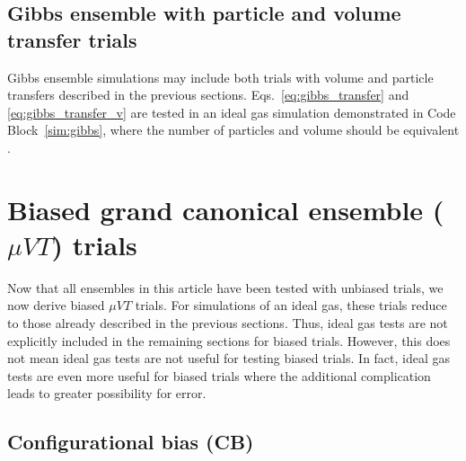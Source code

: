 \documentclass[
  9pt,
  bestpractices,
  pubversion,
]{livecoms}
\begin{document}
\subsection{\label{sec:lhs_gibbs}Gibbs ensemble with particle and volume transfer trials}

Gibbs ensemble simulations may include both trials with volume and particle transfers described in the previous sections.
Eqs.~\ref{eq:gibbs_transfer} and \ref{eq:gibbs_transfer_v} are tested in an ideal gas simulation demonstrated in Code Block~\ref{sim:gibbs}, where the number of particles and volume should be equivalent \cite{hatch_theory_2024}.

\begin{figure}

\end{figure}

\section{\label{sec:lhs_gcmc_bias}Biased grand canonical ensemble ($\mu VT$) trials}

Now that all ensembles in this article have been tested with unbiased trials, we now derive biased $\mu VT$ trials.
For simulations of an ideal gas, these trials reduce to those already described in the previous sections.
Thus, ideal gas tests are not explicitly included in the remaining sections for biased trials.
However, this does not mean ideal gas tests are not useful for testing biased trials.
In fact, ideal gas tests are even more useful for biased trials where the additional complication leads to greater possibility for error.

\subsection{\label{sec:lhs_insdel_cb}Configurational bias (CB)}
\end{document}
